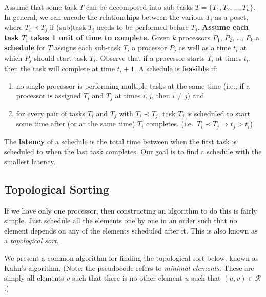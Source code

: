 \documentclass{article}
\begin{document}
    \vspace{3mm} Assume that some task $T$ can be decomposed into sub-tasks $T = \{T_{1}, T_{2}, \dots, T_{n}\}$. In general, we can encode the relationships between the various $T_{i}$ as a poset, where $T_{i} \prec T_{j}$ if (sub)task $T_{i}$ needs to be performed before $T_{j}$. \textbf{Assume each task $T_{i}$ takes 1 unit of time to complete.} Given $k$ processors $P_{1}$, $P_{2}$, \dots, $P_{k}$ a \textbf{schedule} for $T$ assigns each sub-task $T_{i}$ a processor $P_{j}$ as well as a time $t_{i}$ at which $P_{j}$ should start task $T_{i}$. Observe that if a processor starts $T_{i}$ at times $t_{i}$, then the task will complete at time $t_{i} + 1$. A schedule is \textbf{feasible} if:
    \begin{enumerate}[label = \arabic*]
        \item no single processor is performing multiple tasks at the same time (i.e., if a processor is assigned $T_{i}$ and $T_{j}$ at times $i, j$, then $i \ne j$) and
        \item for every pair of tasks $T_{i}$ and $T_{j}$ with $T_{i} \prec T_{j}$, task $T_{j}$ is scheduled to start some time after (or at the same time) $T_{i}$ completes. (i.e.\ $T_{i} \prec T_{j} \Rightarrow t_{j} > t_{i}$)
    \end{enumerate}
    The \textbf{latency} of a schedule is the total time between when the first task is scheduled to when the last task completes. Our goal is to find a schedule with the smallest latency.

    \subsection*{Topological Sorting}
    If we have only one processor, then constructing an algorithm to do this is fairly simple. Just schedule all the elements one by one in an order such that no element depends on any of the elements scheduled after it. This is also known as a \textit{topological sort}.

    \vspace{3mm}
    We present a common algorithm for finding the topological sort below, known as Kahn's algorithm. (Note: the pseudocode refers to \textit{minimal elements}. These are simply all elements $v$ such that there is no other element $u$ such that $(u, v) \in \mathcal{R}$.)
\end{document}

